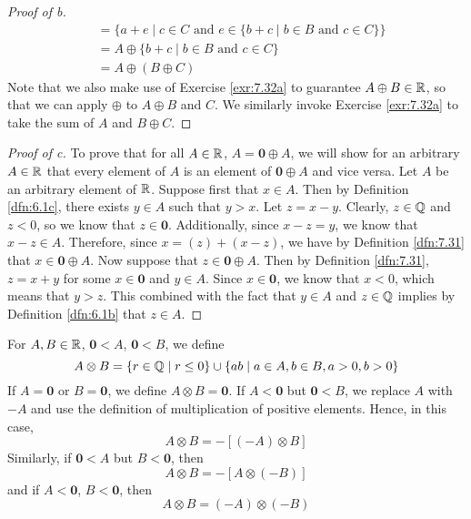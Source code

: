 \documentclass[../main.tex]{subfiles}
\begin{document}
\begin{exercise}
\begin{proof}[Proof of b]
\begin{align*}
            &= \{a+e\mid c\in C\text{ and }e\in\{b+c\mid b\in B\text{ and }c\in C\}\}\\
            &= A\oplus\{b+c\mid b\in B\text{ and }c\in C\}\\
            &= A\oplus(B\oplus C)
        \end{align*}
        Note that we also make use of Exercise \ref{exr:7.32a} to guarantee $A\oplus B\in\mathbb{R}$, so that we can apply $\oplus$ to $A\oplus B$ and $C$. We similarly invoke Exercise \ref{exr:7.32a} to take the sum of $A$ and $B\oplus C$.
    \end{proof}
    \begin{proof}[Proof of c]
        To prove that for all $A\in\mathbb{R}$, $A=\bm{0}\oplus A$, we will show for an arbitrary $A\in\mathbb{R}$ that every element of $A$ is an element of $\bm{0}\oplus A$ and vice versa. Let $A$ be an arbitrary element of $\mathbb{R}$. Suppose first that $x\in A$. Then by Definition \ref{dfn:6.1c}, there exists $y\in A$ such that $y>x$. Let $z=x-y$. Clearly, $z\in\mathbb{Q}$ and $z<0$, so we know that $z\in\bm{0}$. Additionally, since $x-z=y$, we know that $x-z\in A$. Therefore, since $x=(z)+(x-z)$, we have by Definition \ref{dfn:7.31} that $x\in\bm{0}\oplus A$. Now suppose that $z\in\bm{0}\oplus A$. Then by Definition \ref{dfn:7.31}, $z=x+y$ for some $x\in\bm{0}$ and $y\in A$. Since $x\in\bm{0}$, we know that $x<0$, which means that $y>z$. This combined with the fact that $y\in A$ and $z\in\mathbb{Q}$ implies by Definition \ref{dfn:6.1b} that $z\in A$.
    \end{proof}
\end{exercise}

\setcounter{theorem}{38}

\begin{definition}\label{dfn:7.39}
    For $A,B\in\mathbb{R}$, $\bm{0}<A$, $\bm{0}<B$, we define
    \begin{equation*}
        A\otimes B = \{r\in\mathbb{Q}\mid r\leq 0\}\cup\{ab\mid a\in A,b\in B,a>0,b>0\}
    \end{equation*}
    If $A=\bm{0}$ or $B=\bm{0}$, we define $A\otimes B=\bm{0}$. If $A<\bm{0}$ but $\bm{0}<B$, we replace $A$ with $-A$ and use the definition of multiplication of positive elements. Hence, in this case,
    \begin{equation*}
        A\otimes B = -[(-A)\otimes B]
    \end{equation*}
    Similarly, if $\bm{0}<A$ but $B<\bm{0}$, then
    \begin{equation*}
        A\otimes B = -[A\otimes(-B)]
    \end{equation*}
    and if $A<\bm{0}$, $B<\bm{0}$, then
    \begin{equation*}
        A\otimes B = (-A)\otimes(-B)
    \end{equation*}
\end{definition}
\pagebreak
\end{document}
